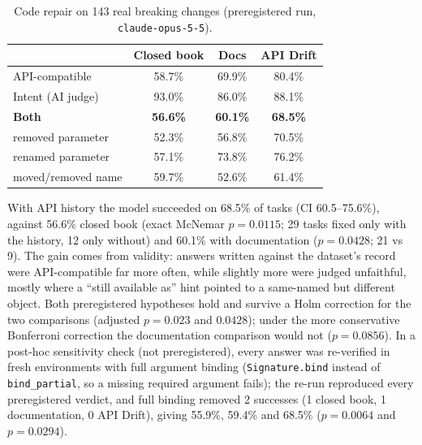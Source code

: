 \documentclass[10pt,twocolumn,letterpaper]{article}
\begin{document}
\begin{table}[t]\centering\small
\caption{Code repair on 143 real breaking changes (preregistered run, \texttt{claude-opus-5-5}).}\label{tab:repair}
\begin{tabular}{@{}lccc@{}}\toprule
 & Closed book & Docs & API Drift \\\midrule
API-compatible & 58.7\% & 69.9\% & 80.4\% \\
Intent (AI judge) & 93.0\% & 86.0\% & 88.1\% \\
\textbf{Both} & \textbf{56.6\%} & \textbf{60.1\%} & \textbf{68.5\%} \\
\quad removed parameter & 52.3\% & 56.8\% & 70.5\% \\
\quad renamed parameter & 57.1\% & 73.8\% & 76.2\% \\
\quad moved/removed name & 59.7\% & 52.6\% & 61.4\% \\\bottomrule
\end{tabular}\end{table}

With API history the model succeeded on 68.5\% of tasks (CI 60.5--75.6\%), against 56.6\% closed book
(exact McNemar $p=0.0115$; 29 tasks fixed only with the history, 12 only without) and
60.1\% with documentation ($p=0.0428$; 21 vs 9). The gain comes from validity: answers
written against the dataset's record were API-compatible far more often, while slightly more were judged unfaithful,
mostly where a ``still available as'' hint pointed to a same-named but different object. Both preregistered
hypotheses hold and survive a Holm correction for the two comparisons (adjusted $p=0.023$ and
$0.0428$); under the more conservative Bonferroni correction the documentation comparison would not
($p=0.0856$). In a post-hoc sensitivity check (not preregistered), every answer was re-verified in fresh
environments with full argument binding (\texttt{Signature.bind} instead of \texttt{bind\_partial}, so a missing
required argument fails); the re-run reproduced every
preregistered verdict, and full binding removed 2 successes (1 closed book, 1
documentation, 0 API Drift), giving 55.9\%, 59.4\% and 68.5\% ($p=0.0064$ and
$p=0.0294$).
\end{document}
